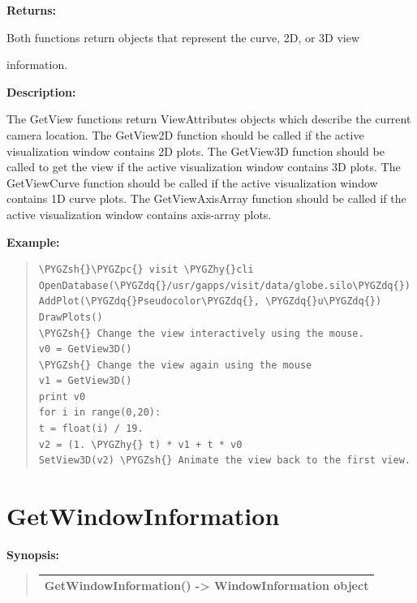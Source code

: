 \documentclass[letterpaper,10pt,english]{sphinxmanual}
\def\PYGZsh{\char`\#}
\def\PYGZpc{\char`\%}
\def\PYGZhy{\char`\-}
\def\PYGZdq{\char`\"}
\begin{document}
\begin{DUlineblock}{0em}
\item[] 
\item[] \textbf{Returns:}
\item[] Both functions return objects that represent the curve, 2D, or 3D view
\item[] information.
\item[] 
\item[] \textbf{Description:}
\item[] The GetView functions return ViewAttributes objects which describe the
current camera location. The GetView2D function should be called if the
active visualization window contains 2D plots. The GetView3D function
should be called to get the view if the active visualization window
contains 3D plots. The GetViewCurve function should be called if the active
visualization window contains 1D curve plots.  The GetViewAxisArray
function should be called if the active visualization window contains
axis-array plots.
\end{DUlineblock}

\begin{DUlineblock}{0em}
\item[] 
\end{DUlineblock}

\begin{DUlineblock}{0em}
\item[] \textbf{Example:}
\item[] 
\end{DUlineblock}
\begin{quote}

\begin{Verbatim}[commandchars=\\\{\}]
\PYGZsh{}\PYGZpc{} visit \PYGZhy{}cli
OpenDatabase(\PYGZdq{}/usr/gapps/visit/data/globe.silo\PYGZdq{})
AddPlot(\PYGZdq{}Pseudocolor\PYGZdq{}, \PYGZdq{}u\PYGZdq{})
DrawPlots()
\PYGZsh{} Change the view interactively using the mouse.
v0 = GetView3D()
\PYGZsh{} Change the view again using the mouse
v1 = GetView3D()
print v0
for i in range(0,20):
t = float(i) / 19.
v2 = (1. \PYGZhy{} t) * v1 + t * v0
SetView3D(v2) \PYGZsh{} Animate the view back to the first view.
\end{Verbatim}
\end{quote}


\section{GetWindowInformation}
\label{functions:getwindowinformation}
\begin{DUlineblock}{0em}
\item[] \textbf{Synopsis:}
\end{DUlineblock}
\begin{quote}

\begin{tabulary}{\linewidth}{|L|}
\hline

GetWindowInformation() -\textgreater{} WindowInformation object
\\
\hline\end{tabulary}

\end{quote}
\end{document}
